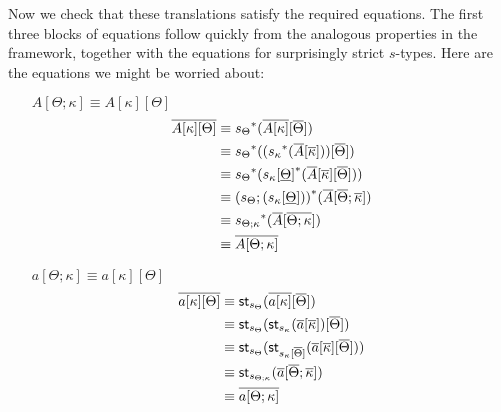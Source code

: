 \documentclass[10pt]{article}
\theoremstyle{definition}
\newcommand\St[2]{\ensuremath{{#1}^*(#2)}}
\newcommand\StI[2]{\ensuremath{\mathsf{st}_{#1}(#2)}}
\begin{document}
Now we check that these translations satisfy the required equations. The first three blocks of equations follow quickly from the analogous properties in the framework, together with the equations for surprisingly strict $s$-types. Here are the equations we might be worried about:
\begin{enumerate}[style = multiline, labelwidth = 80pt]
\item[{$A[\Theta ; \kappa] \equiv A[\kappa][\Theta]$}] 
\begin{align*}
\upstairs{A[\kappa][\Theta]}
&\equiv \St{s_{\Theta}}{\upstairs{A[\kappa]}[\upstairs{\Theta}]} \\
&\equiv \St{s_{\Theta}}{(\St{s_{\kappa}}{\upstairs{A}[\upstairs{\kappa}]})[\upstairs{\Theta}]} \\
&\equiv \St{s_\Theta}{\St{s_\kappa[\downstairs{\Theta}]}{\upstairs{A}[ \upstairs{\kappa}][\upstairs{\Theta}]}} \\
&\equiv \St{(s_\Theta; (s_\kappa[\downstairs{\Theta}]))}{\upstairs{A}[\upstairs{\Theta} ; \upstairs{\kappa}]} \\
&\equiv \St{s_{\Theta ; \kappa}}{\upstairs{A}[\upstairs{\Theta ; \kappa}]} \\
&\equiv \upstairs{A[\Theta ; \kappa]}
\end{align*}

\item[{$a[\Theta ; \kappa] \equiv a[\kappa][\Theta]$}] 
\begin{align*}
\upstairs{a[\kappa][\Theta]}
&\equiv \StI{s_\Theta}{\upstairs{a[\kappa]}[\upstairs{\Theta}]} \\
&\equiv \StI{s_\Theta}{\StI{s_\kappa}{\upstairs{a}[\upstairs{\kappa}]}[\upstairs{\Theta}]} \\
&\equiv \StI{s_\Theta}{\StI{s_\kappa[\upstairs{\Theta}]}{\upstairs{a}[\upstairs{\kappa}][\upstairs{\Theta}]}} \\
&\equiv \StI{s_{\Theta;\kappa}}{\upstairs{a}[\upstairs{\Theta};\upstairs{\kappa}]} \\
&\equiv \upstairs{a[\Theta ; \kappa]}
\end{align*}


\end{enumerate}
\end{document}
